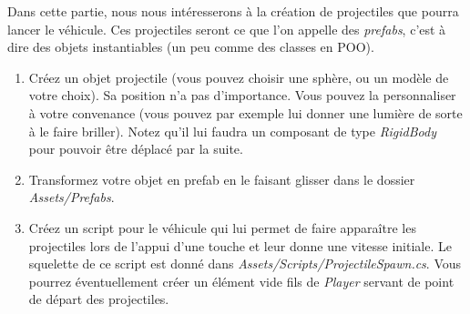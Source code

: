 Dans cette partie, nous nous intéresserons à la création de projectiles que pourra lancer le véhicule. Ces projectiles seront ce que l'on appelle des \textit{prefabs}, c'est à dire des objets instantiables (un peu comme des classes en POO).

\begin{enumerate}
\item Créez un objet projectile (vous pouvez choisir une sphère, ou un modèle de votre choix). Sa position n'a pas d'importance. Vous pouvez la personnaliser à votre convenance (vous pouvez par exemple lui donner une lumière de sorte à le faire briller). Notez qu'il lui faudra un composant de type \textit{RigidBody} pour pouvoir être déplacé par la suite.
\item Transformez votre objet en prefab en le faisant glisser dans le dossier \textit{Assets/Prefabs}.
\item Créez un script pour le véhicule qui lui permet de faire apparaître les projectiles lors de l'appui d'une touche et leur donne une vitesse initiale. Le squelette de ce script est donné dans \textit{Assets/Scripts/ProjectileSpawn.cs}. Vous pourrez éventuellement créer un élément vide fils de \textit{Player} servant de point de départ des projectiles.
\end{enumerate}
